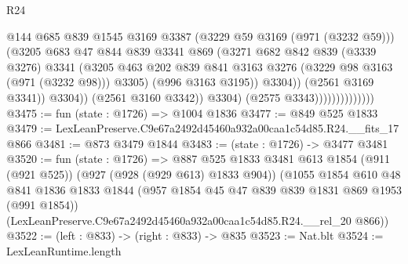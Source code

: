 \begin{lexlean}{R24}
\begin{coremodule}
                                          @144
                                          @685
                                          @839
                                          @1545
                                          @3169
                                          @3387
                                          (@3229 @59 @3169 (@971 (@3232 @59)))
                                          (@3205
                                            @683
                                            @47
                                            @844
                                            @839
                                            @3341
                                            @869
                                            (@3271
                                              @682
                                              @842
                                              @839
                                              (@3339 @3276)
                                              @3341
                                              (@3205
                                                @463
                                                @202
                                                @839
                                                @841
                                                @3163
                                                @3276
                                                (@3229 @98 @3163 (@971 (@3232 @98)))
                                                @3305)
                                              (@996 @3163 @3195))
                                            @3304))
                                        (@2561 @3169 @3341))
                                      @3304))
                                  (@2561 @3160 @3342))
                                @3304)
                              (@2575 @3343))))))))))))))
@3475 := fun (state : @1726) => @1004 @1836
@3477 := @849 @525 @1833
@3479 := LexLeanPreserve.C9e67a2492d45460a932a00caa1c54d85.R24.__fits_17 @866
@3481 := @873 @3479 @1844
@3483 := (state : @1726) -> @3477 @3481
@3520 := fun (state : @1726) =>
  @887
    @525
    @1833
    @3481
    @613
    @1854
    (@911 (@921 @525))
    (@927 (@928 (@929 @613) @1833 @904))
    (@1055
      @1854
      @610
      @48
      @841
      @1836
      @1833
      @1844
      (@957 @1854 @45 @47 @839 @839 @1831 @869 @1953 (@991 @1854))
      (LexLeanPreserve.C9e67a2492d45460a932a00caa1c54d85.R24.__rel_20 @866))
@3522 := (left : @833) -> (right : @833) -> @835
@3523 := Nat.blt
@3524 := LexLeanRuntime.length

\end{coremodule}
\end{lexlean}
